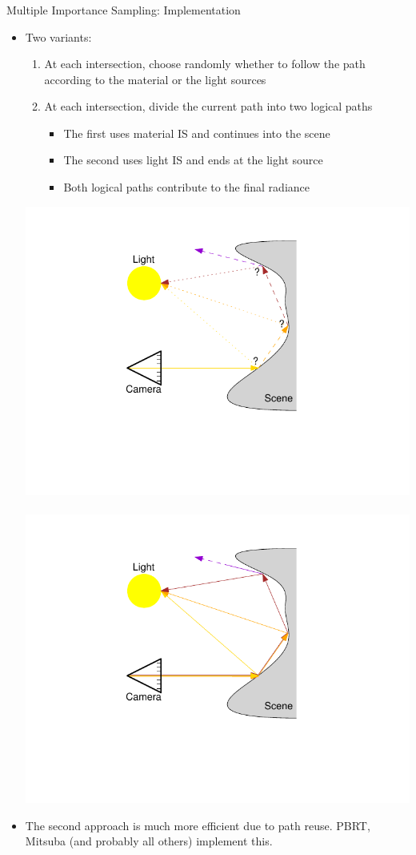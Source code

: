 \documentclass[utf8,stillsansserifmath,fleqn,t]{beamer}
\begin{document}
\begin{frame}[label=mis-2]
\frametitle{\insertsection}
Multiple Importance Sampling: Implementation
\begin{itemize}
\item Two variants:
    \begin{enumerate}
    \item At each intersection, choose randomly whether to follow the path
    according to the material or the light sources
    \item At each intersection, divide the current path into two logical paths
        \begin{itemize}
        \item The first uses material IS and continues into the scene
        \item The second uses light IS and ends at the light source
        \item Both logical paths contribute to the final radiance
        \end{itemize}
    \end{enumerate}
    \includegraphics[width=.3\textwidth]{./fig/mis-single-path.pdf}~~~~~~~~~
    \includegraphics[width=.3\textwidth]{./fig/mis-path-reuse.pdf}
\item The second approach is much more efficient due to path reuse. PBRT, Mitsuba (and probably all others) implement this.
\end{itemize}
\end{frame}
\end{document}
